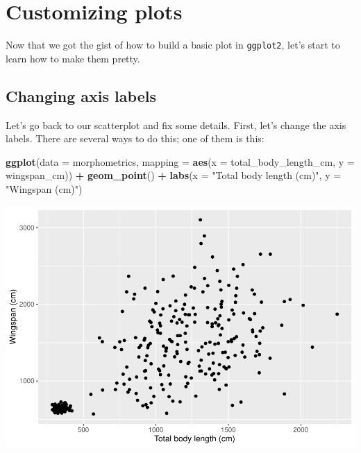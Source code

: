 \documentclass[
]{book}
\newenvironment{Shaded}{\begin{snugshade}}{\end{snugshade}}
\newcommand{\AttributeTok}[1]{\textcolor[rgb]{0.13,0.29,0.53}{#1}}
\newcommand{\FunctionTok}[1]{\textcolor[rgb]{0.13,0.29,0.53}{\textbf{#1}}}
\newcommand{\NormalTok}[1]{#1}
\newcommand{\SpecialCharTok}[1]{\textcolor[rgb]{0.81,0.36,0.00}{\textbf{#1}}}
\newcommand{\StringTok}[1]{\textcolor[rgb]{0.31,0.60,0.02}{#1}}
\begin{document}
\hypertarget{customizing-plots}{%
\section{Customizing plots}\label{customizing-plots}}

Now that we got the gist of how to build a basic plot in \texttt{ggplot2}, let's start
to learn how to make them pretty.

\hypertarget{changing-axis-labels}{%
\subsection{Changing axis labels}\label{changing-axis-labels}}

Let's go back to our scatterplot and fix some
details. First, let's change the axis labels. There are several ways to do this;
one of them is this:

\begin{Shaded}
\begin{Highlighting}[]
\FunctionTok{ggplot}\NormalTok{(}\AttributeTok{data =}\NormalTok{ morphometrics, }
       \AttributeTok{mapping =} \FunctionTok{aes}\NormalTok{(}\AttributeTok{x =}\NormalTok{ total\_body\_length\_cm, }\AttributeTok{y =}\NormalTok{ wingspan\_cm)) }\SpecialCharTok{+}
  \FunctionTok{geom\_point}\NormalTok{() }\SpecialCharTok{+}
  \FunctionTok{labs}\NormalTok{(}\AttributeTok{x =} \StringTok{"Total body length (cm)"}\NormalTok{, }\AttributeTok{y =} \StringTok{"Wingspan (cm)"}\NormalTok{)}
\end{Highlighting}
\end{Shaded}

\includegraphics{reproducible-science_files/figure-latex/gg6-1.pdf}
\end{document}
